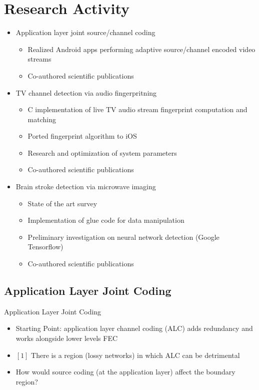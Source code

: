 \documentclass{if-beamer}
\begin{document}
\section{Research Activity}

\begin{frame}
\begin{itemize}
\item Application layer joint source/channel coding
\begin{itemize}
\item Realized Android apps performing adaptive source/channel encoded video streams
\item Co-authored scientific publications
\end{itemize}
\item TV channel detection via audio fingerpritning
\begin{itemize}
\item C implementation of live TV audio stream fingerprint computation and matching
\item Ported fingerprint algorithm to iOS
\item Research and optimization of system parameters
\item Co-authored scientific publications
\end{itemize}
\item Brain stroke detection via microwave imaging
\begin{itemize}
\item State of the art survey
\item Implementation of glue code for data manipulation
\item Preliminary investigation on neural network detection (Google Tensorflow)
\item Co-authored scientific publications
\end{itemize}
\end{itemize}
\end{frame}

\iffalse
\subsection{Application Layer Joint Coding}
\begin{frame}
Application Layer Joint Coding


\begin{itemize}
\item Starting Point: application layer channel coding (ALC) adds redundancy and works alongside lower levels FEC
\item $[1]$ There is a region (lossy networks) in which ALC can be detrimental
\item How would source coding (at the application layer) affect the boundary region?
\end{itemize}
\end{frame}
\end{document}
